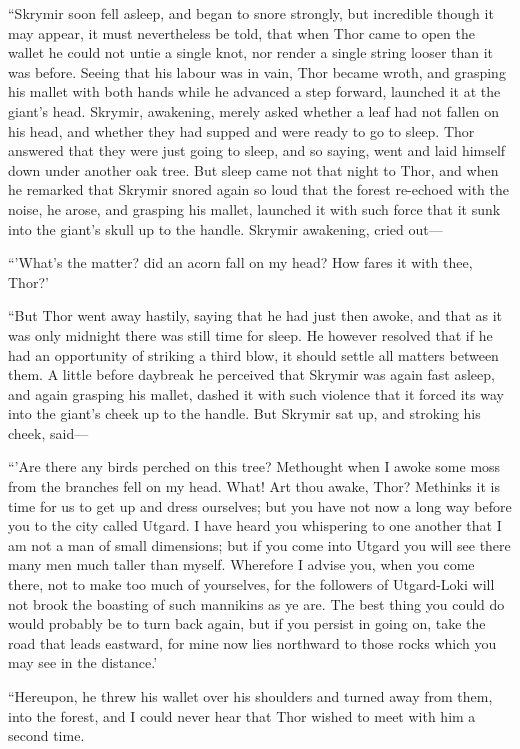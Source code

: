 ``Skrymir soon fell asleep, and began to snore strongly, but incredible
though it may appear, it must nevertheless be told, that when Thor
came to open the wallet he could not untie a single knot, nor render a
single string looser than it was before. Seeing that his labour was in
vain, Thor became wroth, and grasping his mallet with both hands while
he advanced a step forward, launched it at the giant's head. Skrymir,
awakening, merely asked whether a leaf had not fallen on his head, and
whether they had supped and were ready to go to sleep. Thor answered
that they were just going to sleep, and so saying, went and laid
himself down under another oak tree. But sleep came not that night to
Thor, and when he remarked that Skrymir snored again so loud that the
forest re-echoed with the noise, he arose, and grasping his mallet,
launched it with such force that it sunk into the giant's skull up to
the handle. Skrymir awakening, cried out—

``'What's the matter? did an acorn fall on my head? How fares it with
thee, Thor?'

``But Thor went away hastily, saying that he had just then awoke, and
that as it was only midnight there was still time for sleep. He
however resolved that if he had an opportunity of striking a third
blow, it should settle all matters between them. A little before
daybreak he perceived that Skrymir was again fast asleep, and again
grasping his mallet, dashed it with such violence that it forced its
way into the giant's cheek up to the handle. But Skrymir sat up, and
stroking his cheek, said—

``'Are there any birds perched on this tree? Methought when I awoke
some moss from the branches fell on my head. What! Art thou awake,
Thor? Methinks it is time for us to get up and dress ourselves; but
you have not now a long way before you to the city called Utgard. I
have heard you whispering to one another that I am not a man of small
dimensions; but if you come into Utgard you will see there many men
much taller than myself. Wherefore I advise you, when you come there,
not to make too much of yourselves, for the followers of Utgard-Loki
will not brook the boasting of such mannikins as ye are. The best
thing you could do would probably be to turn back again, but if you
persist in going on, take the road that leads eastward, for mine now
lies northward to those rocks which you may see in the distance.'

``Hereupon, he threw his wallet over his shoulders and turned away from
them, into the forest, and I could never hear that Thor wished to meet
with him a second time.

